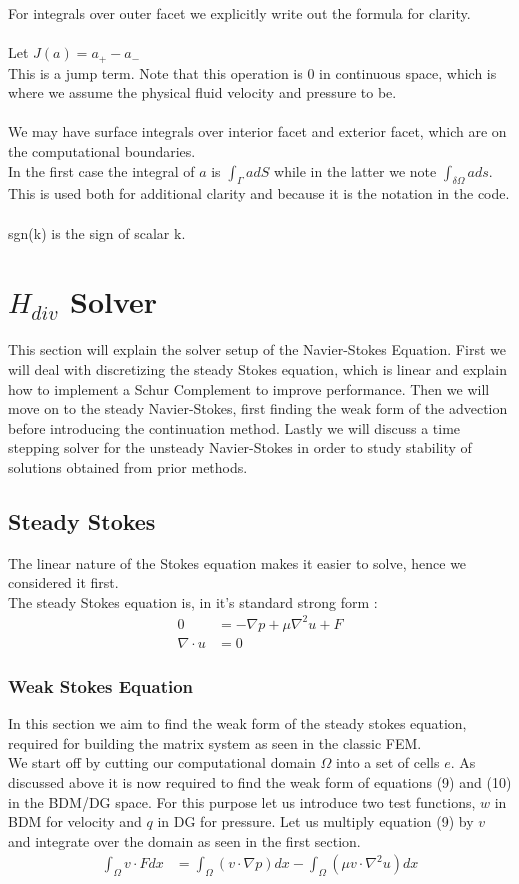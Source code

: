 \documentclass[11pt,twoside,a4paper]{article}
\begin{document}
For integrals over outer facet we explicitly write out the formula for clarity.\\
\\
Let $J(a) = a_+ - a_-$\\
This is a jump term. Note that this operation is $0$ in continuous space, which is where we assume the physical fluid velocity and pressure to be.\\
\\
We may have surface integrals over interior facet and exterior facet, which are on the computational boundaries.\\
In the first case the integral of $a$ is $\int_\Gamma a dS$ while in the latter we note $\int_{\delta \Omega} a ds$.\\
This is used both for additional clarity and because it is the notation in the code.\\
\\
sgn(k) is the sign of scalar k.

\section{$H_{div}$ Solver}
This section will explain the solver setup of the Navier-Stokes Equation. First we will deal with discretizing the steady Stokes equation, which is linear and explain how to implement a Schur Complement to improve performance. Then we will move on to the steady Navier-Stokes, first finding the weak form of the advection before introducing the continuation method. Lastly we will discuss a time stepping solver for the unsteady Navier-Stokes in order to study stability of solutions obtained from prior methods.
\subsection{Steady Stokes}
The linear nature of the Stokes equation makes it easier to solve, hence we considered it first.\\
The steady Stokes equation is, in it's standard strong form :
\begin{align}
0 &= -\nabla p + \mu \nabla^2 u + F  \\
\nabla \cdot u &= 0
\end{align}

\subsubsection{Weak Stokes Equation}
In this section we aim to find the weak form of the steady stokes equation, required for building the matrix system as seen in the classic FEM.\\
We start off by cutting our computational domain $\Omega$ into a set of cells $e$. As discussed above it is now required to find the weak form of equations (9) and (10) in the BDM/DG space.
For this purpose let us introduce two test functions, $w$ in BDM for velocity and $q$ in DG for pressure.
Let us multiply equation (9) by $v$ and integrate over the domain as seen in the first section.
\begin{align*}
\int_\Omega v \cdot F dx &= \int_\Omega (v \cdot \nabla p) dx - \int_\Omega (\mu v \cdot \nabla^2 u) dx
\end{align*}
\end{document}
